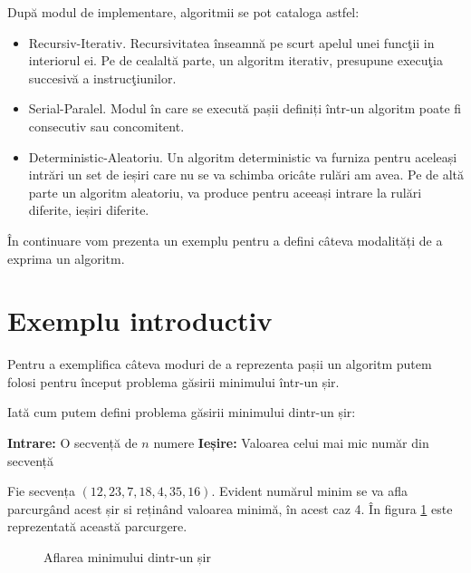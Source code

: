 După modul de implementare, algoritmii se pot cataloga astfel:

\begin{itemize}
	\item {Recursiv-Iterativ. Recursivitatea înseamnă pe scurt apelul unei funcţii in interiorul ei. Pe de cealaltă parte, un algoritm iterativ, presupune execuţia succesivă a instrucţiunilor.}
	\item {Serial-Paralel. Modul în care se execută pașii definiți într-un algoritm poate fi consecutiv sau concomitent.}
	\item {Deterministic-Aleatoriu. Un algoritm deterministic va furniza pentru aceleași intrări un set de ieșiri care nu se va schimba oricâte rulări am avea. Pe de altă parte un algoritm aleatoriu, va produce pentru aceeași intrare la rulări diferite, ieșiri diferite.}
\end{itemize}

În continuare vom prezenta un exemplu pentru a defini câteva modalități de a exprima un algoritm.

\section{Exemplu introductiv}

Pentru a exemplifica câteva moduri de a reprezenta pașii un algoritm putem folosi pentru început problema găsirii minimului într-un șir.

Iată cum putem defini problema găsirii minimului dintr-un șir:

\textbf{Intrare: } O secvență de $n$ numere 
\textbf{Ieșire: } Valoarea celui mai mic număr din secvență

Fie secvența $(12,23,7,18,4,35,16)$. Evident numărul minim se va afla parcurgând acest șir si reținând valoarea minimă, în acest caz 4.
În figura \ref{fig:minimum} este reprezentată această parcurgere.

\begin{figure}[ht] %
  \centering
  \caption{Aflarea minimului dintr-un șir} 
  \label{fig:minimum}
\end{figure}

